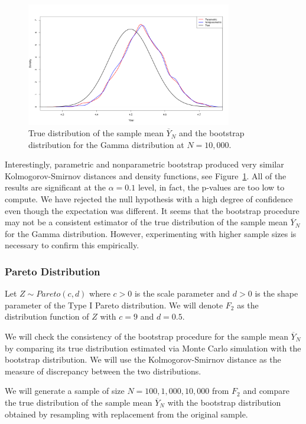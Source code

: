 \documentclass{article}
\begin{document}
\begin{figure}[h]
\centering
\includegraphics[width=0.8\textwidth]{gamma_bootstrap_distributions.png}
\caption{True distribution of the sample mean \(\overline{Y}_N\) and the bootstrap distribution for the Gamma distribution at \(N = 10,000\).}
\label{fig:gamma_bootstrap}
\end{figure}

Interestingly, parametric and nonparametric bootstrap produced very similar Kolmogorov-Smirnov distances and density functions, see Figure~\ref{fig:gamma_bootstrap}. All of the results are significant at the \(\alpha = 0.1\) level, in fact, the p-values are too low to compute. We have rejected the null hypothesis with a high degree of confidence even though the expectation was different. It seems that the bootstrap procedure may not be a consistent estimator of the true distribution of the sample mean \(\overline{Y}_N\) for the Gamma distribution. However, experimenting with higher sample sizes is necessary to confirm this empirically.

\subsubsection{Pareto Distribution}

Let \(Z \sim Pareto(c, d)\) where \(c > 0\) is the scale parameter and \(d > 0\) is the shape parameter of the Type I Pareto distribution. We will denote \(F_2\) as the distribution function of \(Z\) with \(c = 9\) and \(d = 0.5\).

We will check the consistency of the bootstrap procedure for the sample mean \(\overline{Y}_N\) by comparing its true distribution estimated via Monte Carlo simulation with the bootstrap distribution. We will use the Kolmogorov-Smirnov distance as the measure of discrepancy between the two distributions.

We will generate a sample of size \(N = 100, 1,000, 10,000\) from \(F_2\) and compare the true distribution of the sample mean \(\overline{Y}_N\) with the bootstrap distribution obtained by resampling with replacement from the original sample.
\end{document}
